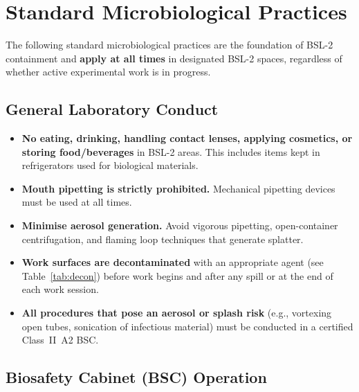 
\section{Standard Microbiological Practices}
\label{sec:practices}

The following standard microbiological practices are the foundation of BSL-2
containment and \textbf{apply at all times} in designated BSL-2 spaces, regardless
of whether active experimental work is in progress.

\subsection{General Laboratory Conduct}

\begin{itemize}[leftmargin=1.6em, itemsep=3pt]
  \item \textbf{No eating, drinking, handling contact lenses, applying cosmetics, or
        storing food/beverages} in BSL-2 areas. This includes items kept in refrigerators
        used for biological materials.
  \item \textbf{Mouth pipetting is strictly prohibited.} Mechanical pipetting devices
        must be used at all times.
  \item \textbf{Minimise aerosol generation.} Avoid vigorous pipetting, open-container
        centrifugation, and flaming loop techniques that generate splatter.
  \item \textbf{Work surfaces are decontaminated} with an appropriate agent (see
        Table~\ref{tab:decon}) before work begins and after any spill or at the end of
        each work session.
  \item \textbf{All procedures that pose an aerosol or splash risk} (e.g., vortexing
        open tubes, sonication of infectious material) must be conducted in a certified
        Class~II~A2 BSC.
\end{itemize}

\subsection{Biosafety Cabinet (BSC) Operation}

